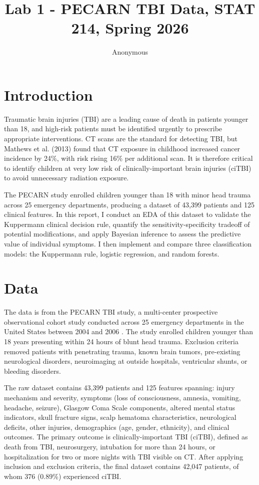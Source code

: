\documentclass[11pt,letterpaper]{article}
\title{Lab 1 - PECARN TBI Data, STAT 214, Spring 2026}
\author{Anonymous}
\begin{document}
\maketitle

\section{Introduction}\label{introduction}

Traumatic brain injuries (TBI) are a leading cause of death in patients younger than 18, and high-risk patients must be identified urgently to prescribe appropriate interventions. CT scans are the standard for detecting TBI, but Mathews et al. (2013) \cite{Mathews2013} found that CT exposure in childhood increased cancer incidence by 24\%, with risk rising 16\% per additional scan. It is therefore critical to identify children at very low risk of clinically-important brain injuries (ciTBI) to avoid unnecessary radiation exposure.

The PECARN study enrolled children younger than 18 with minor head trauma across 25 emergency departments, producing a dataset of 43,399 patients and 125 clinical features. In this report, I conduct an EDA of this dataset to validate the Kuppermann clinical decision rule, quantify the sensitivity-specificity tradeoff of potential modifications, and apply Bayesian inference to assess the predictive value of individual symptoms. I then implement and compare three classification models: the Kuppermann rule, logistic regression, and random forests.



\section{Data}\label{data}

The data is from the PECARN TBI study, a multi-center prospective observational cohort study conducted across 25 emergency departments in the United States between 2004 and 2006 \cite{Kuppermann2009}. The study enrolled children younger than 18 years presenting within 24 hours of blunt head trauma. Exclusion criteria removed patients with penetrating trauma, known brain tumors, pre-existing neurological disorders, neuroimaging at outside hospitals, ventricular shunts, or bleeding disorders.

The raw dataset contains 43,399 patients and 125 features spanning: injury mechanism and severity, symptoms (loss of consciousness, amnesia, vomiting, headache, seizure), Glasgow Coma Scale components, altered mental status indicators, skull fracture signs, scalp hematoma characteristics, neurological deficits, other injuries, demographics (age, gender, ethnicity), and clinical outcomes. The primary outcome is clinically-important TBI (ciTBI), defined as death from TBI, neurosurgery, intubation for more than 24 hours, or hospitalization for two or more nights with TBI visible on CT. After applying inclusion and exclusion criteria, the final dataset contains 42,047 patients, of whom 376 (0.89\%) experienced ciTBI.
\end{document}
